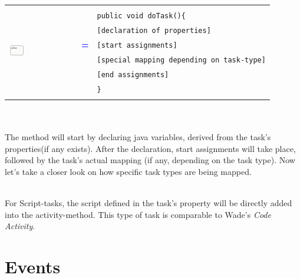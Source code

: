 \begin{tabularx}{\linewidth}{lcX}
	\multirow{8}{*}{\includegraphics[width=0.25\textwidth]{images/mapping/task.png}} &  &\\
	& & \texttt{public void doTask()\{}\\
	& & \texttt{\hspace{10pt}[declaration of properties]}\\
	& \textbf{\textcolor{blue}{=}} & \texttt{\hspace{10pt}[start assignments]}\\
	& & \texttt{\hspace{10pt}[special mapping depending on task-type]}\\
	& & \texttt{\hspace{10pt}[end assignments]}\\
	& & \texttt{\}}\\
	& & \\
\end{tabularx}\\\\

The method will start by declaring java variables, derived from the task's properties(if any exists). After the declaration, start assignments will take place, followed by the task's actual mapping (if any, depending on the task type). Now let's take a closer look on how specific task types are being mapped.

\\
For Script-tasks, the script defined in the task's property will be directly added into the activity-method. This type of task is comparable to Wade's \textit{Code Activity}.

\taskbf{}
\section{Events}
